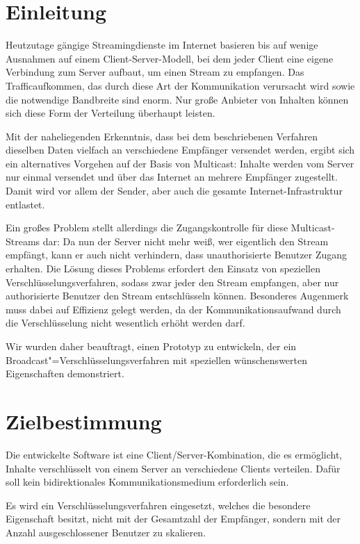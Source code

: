 \documentclass[a4paper,10pt]{article}
\title{\doctitle}
\author{\authorName}
\date{\today}
\begin{document}

\tableofcontents
\clearpage

\section{Einleitung}

Heutzutage gängige Streamingdienste im Internet basieren bis auf wenige Ausnahmen auf
einem Client-Server-Modell, bei dem jeder Client eine eigene Verbindung zum Server
aufbaut, um einen Stream zu empfangen. Das Trafficaufkommen, das durch diese Art der
Kommunikation verursacht wird sowie die notwendige Bandbreite sind enorm. Nur große
Anbieter von Inhalten können sich diese Form der Verteilung überhaupt leisten.

Mit der naheliegenden Erkenntnis, dass bei dem beschriebenen Verfahren dieselben Daten
vielfach an verschiedene Empfänger versendet werden, ergibt sich ein alternatives
Vorgehen auf der Basis von Multicast: Inhalte werden vom Server nur einmal versendet
und über das Internet an mehrere Empfänger zugestellt. Damit wird vor allem der Sender,
aber auch die gesamte Internet-Infrastruktur entlastet.

Ein großes Problem stellt allerdings die Zugangskontrolle für diese Multicast-Streams
dar: Da nun der Server nicht mehr weiß, wer eigentlich den Stream empfängt, kann
er auch nicht verhindern, dass unauthorisierte Benutzer Zugang erhalten. Die Lösung
dieses Problems erfordert den Einsatz von speziellen Verschlüsselungsverfahren,
sodass zwar jeder den Stream empfangen, aber nur authorisierte Benutzer den Stream
entschlüsseln können. Besonderes Augenmerk muss dabei auf Effizienz gelegt werden,
da der Kommunikationsaufwand durch die Verschlüsselung nicht wesentlich erhöht werden
darf.

Wir wurden daher beauftragt, einen Prototyp zu entwickeln, der ein
Broadcast"=Verschlüsselungsverfahren mit speziellen wünschenswerten Eigenschaften
demonstriert.

\section{Zielbestimmung}

Die entwickelte Software ist eine Client/Server-Kombination, die es ermöglicht,
Inhalte verschlüsselt von einem Server an verschiedene Clients verteilen. Dafür
soll kein bidirektionales Kommunikationsmedium erforderlich sein.

Es wird ein Verschlüsselungsverfahren eingesetzt, welches die besondere
Eigenschaft besitzt, nicht mit der Gesamtzahl der Empfänger, sondern mit der Anzahl
ausgeschlossener Benutzer zu skalieren.
\end{document}

